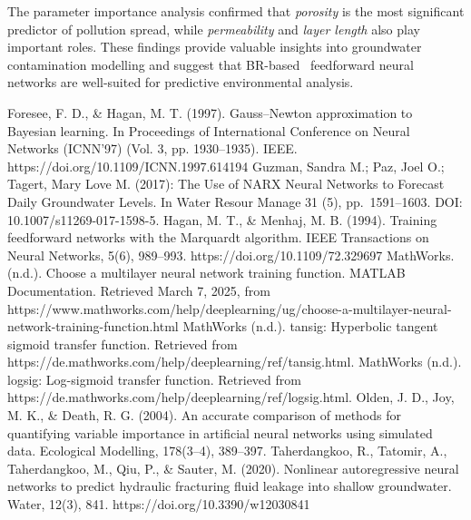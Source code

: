\documentclass[10pt]{article}
\begin{document}
	The parameter importance analysis confirmed that \textit{porosity} is the most significant predictor of pollution spread, while \textit{permeability} and \textit{layer length} also play important roles. These findings provide valuable insights into groundwater contamination modelling and suggest that BR-based  feedforward neural networks are well-suited for predictive environmental analysis.
	
	
	
	
	
	\begin{thebibliography}{99} %
		Foresee, F. D., \& Hagan, M. T. (1997). Gauss–Newton approximation to Bayesian learning. In Proceedings of International Conference on Neural Networks (ICNN’97) (Vol. 3, pp. 1930–1935). IEEE. https://doi.org/10.1109/ICNN.1997.614194
		Guzman, Sandra M.; Paz, Joel O.; Tagert, Mary Love M. (2017): The Use of NARX Neural Networks to Forecast Daily Groundwater Levels. In Water Resour Manage 31 (5), pp. 1591–1603. DOI: 10.1007/s11269-017-1598-5.
		Hagan, M. T., \& Menhaj, M. B. (1994). Training feedforward networks with the Marquardt algorithm. IEEE Transactions on Neural Networks, 5(6), 989–993. https://doi.org/10.1109/72.329697
		MathWorks. (n.d.). Choose a multilayer neural network training function. MATLAB Documentation. Retrieved March 7, 2025, from https://www.mathworks.com/help/deeplearning/ug/choose-a-multilayer-neural-network-training-function.html
		MathWorks (n.d.). tansig: Hyperbolic tangent sigmoid transfer function. Retrieved from https://de.mathworks.com/help/deeplearning/ref/tansig.html.
		MathWorks (n.d.). logsig: Log-sigmoid transfer function. Retrieved from https://de.mathworks.com/help/deeplearning/ref/logsig.html.
		Olden, J. D., Joy, M. K., \& Death, R. G. (2004). An accurate comparison of methods for quantifying variable importance in artificial neural networks using simulated data. Ecological Modelling, 178(3–4), 389–397.
		Taherdangkoo, R., Tatomir, A., Taherdangkoo, M., Qiu, P., \& Sauter, M. (2020). Nonlinear autoregressive neural networks to predict hydraulic fracturing fluid leakage into shallow groundwater. Water, 12(3), 841. https://doi.org/10.3390/w12030841
	\end{thebibliography}
	
\end{document}
